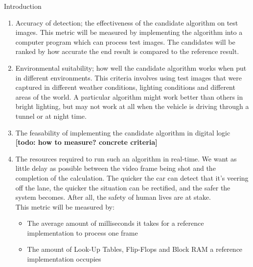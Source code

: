 \documentclass{matthijs}
\begin{document}
\begin{hoofdstuk}{Introduction}
		\begin{enumerate}

			\item	Accuracy of detection; the effectiveness of the candidate algorithm on test images.
				This metric will be measured by implementing the algorithm into a computer program which can process test images.
				The candidates will be ranked by how accurate the end result is compared to the reference result.

			\item	Environmental suitability; how well the candidate algorithm works when put in different environments.
				This criteria involves using test images that were captured in different weather conditions, lighting conditions and different areas of the world.
				A particular algorithm might work better than others in bright lighting, but may not work at all when the vehicle is driving through a tunnel or at night time.

			\item	The feasability of implementing the candidate algorithm in digital logic \textbf{[todo: how to measure? concrete criteria]}
			
			\item	The resources required to run such an algorithm in real-time.
				We want as little delay as possible between the video frame being shot and the completion of the calculation.
				The quicker the car can detect that it's veering off the lane, the quicker the situation can be rectified, and the safer the system becomes.
				After all, the safety of human lives are at stake.\\
				This metric will be measured by:

				\begin{itemize}

					\item The average amount of milliseconds it takes for a reference implementation to process one frame
					\item The amount of Look-Up Tables, Flip-Flops and Block RAM a reference implementation occupies

				\end{itemize}

		\end{enumerate}

	\end{hoofdstuk}
\end{document}
